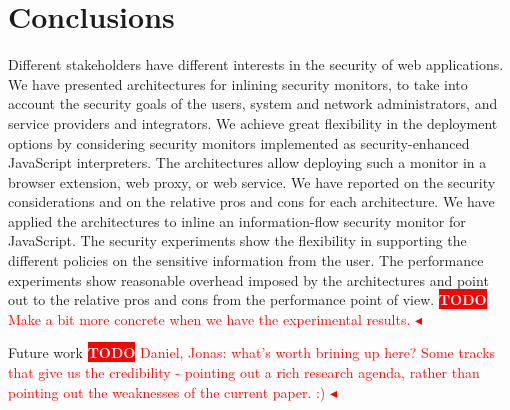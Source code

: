 \documentclass{llncs}
\newcommand{\todo}[1]{\colorbox{red}{\textcolor{white}{\sffamily\bfseries\scriptsize TODO}} \textcolor{red}{#1} \textcolor{red}{$\blacktriangleleft$}}
\begin{document}
\section{Conclusions}
\label{sec:conc}
Different stakeholders have different interests in the security of web
applications. We have presented architectures for inlining security
monitors, to take into account the security goals of the users, system and
network administrators, and service providers and integrators.
%
We achieve great flexibility in the deployment options by considering
security monitors implemented as security-enhanced JavaScript interpreters.
%
The architectures allow deploying such a monitor in a browser
extension, web proxy, or web service.
%
We have reported on the security considerations and on the relative pros and
cons for each architecture.
%
We have applied the architectures to inline an information-flow
security monitor for JavaScript.
%
The security experiments show the
flexibility in supporting the different policies on the sensitive
information from the user. 
%
The performance experiments show reasonable overhead imposed by the
architectures and point out to the relative pros and cons from the
performance point of view. \todo{Make a bit more concrete when we have
the experimental results.}

Future work \todo{Daniel, Jonas: what's worth brining up here? Some
tracks that give us the credibility - pointing out a rich research agenda, rather
than pointing out the weaknesses of the current paper. :) }



\end{document}
